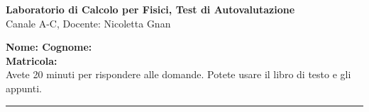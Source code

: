 \documentclass[11pt]{article}
\begin{document}
\pagestyle{empty}

\begin{center}
{\Large \bf  Laboratorio di Calcolo per Fisici, Test di Autovalutazione\\[2mm]}
{\large Canale A-C, Docente: Nicoletta Gnan}
\end{center}
\vspace{4mm}

\begin{mdframed}[backgroundcolor=panna]
{\bf Nome: \qquad \qquad \qquad\qquad \qquad \qquad Cognome:}\\
\newline
{\bf Matricola:}\\
\newline 
Avete 20 minuti per rispondere alle domande. Potete usare il libro di testo e gli appunti.
\end{mdframed}
%
%

\hrule
\vspace{2mm}
\end{document}
